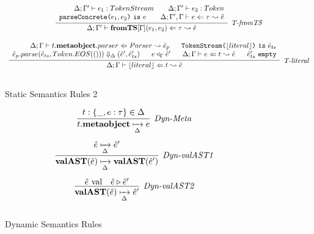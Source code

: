 \begin{figure}
\[\begin{array}{c}
\infer[\textit{T-fromTS}]
	  {\Delta; \Gamma' \vdash \keyw{fromTS}[\Gamma](e_1,e_2) \Leftarrow \tau \leadsto \hat{e} }
	  {\renewcommand{\arraystretch}{1}
	    \begin{array}{r}
	    \Delta;\Gamma' \vdash e_1:TokenStream ~~~~~~ \Delta;\Gamma' \vdash e_2:Token\\
            \texttt{parseConcrete(}e_1,e_2\texttt{)}\ \texttt{is}\ e ~~~~~~\Delta; \Gamma', \Gamma \vdash e \Leftarrow \tau \leadsto \hat{e}
            \end{array}
       } \\[3ex]  

\infer[\textit{T-literal}]
	  {\Delta; \Gamma \vdash \lfloor literal \rfloor \Leftarrow t \leadsto \hat{e} }
	  {\renewcommand{\arraystretch}{1}
	    \begin{array}{r}
	    \Delta;\Gamma \vdash t.\keyw{metaobject}.parser\Leftarrow Parser \leadsto \hat{e}_p ~~~~~ \texttt{TokenStream(}\lfloor literal \rfloor \texttt{)}\ \texttt{is}\ \hat{e}_{ts}\\
            \hat{e}_p.parse(\hat{e}_{ts}, Token.EOS(())) \Downarrow_{\Delta} (\hat{e}', \hat e_{ts}') ~~~~~  e \triangleleft_\Gamma \hat{e}'~~~~~ \Delta;\Gamma\vdash e\Leftarrow t \leadsto \hat{e} ~~~~~ \hat e_{ts}'\ \texttt{empty}
            \end{array}
       } \\[3ex]   
\end{array}
\]
\caption{Static Semantics Rules 2}
\end{figure}

\begin{figure}
\centering
\[
\begin{array}{c}

\infer[\textit{Dyn-Meta}]
	{t.\keyw{metaobject} \xmapsto[\Delta]{} e} 
	{t:\{\_,e:\tau \} \in \Delta}\\[3ex]

\infer[\textit{Dyn-valAST1}]
	{\keyw{valAST}(\hat{e}) \xmapsto[\Delta]{} \keyw{valAST}(\hat{e}') } 
	{\hat{e} \xmapsto[\Delta]{} \hat{e}'}\\[3ex]

\infer[\textit{Dyn-valAST2}]
	{\keyw{valAST}(\hat{e}) \xmapsto[\Delta]{} \hat{e}' } 
	{\hat{e}\ \text{val} &\hat{e} \triangleright \hat{e}' }\\[3ex]




\end{array}
\]
\caption{Dynamic Semantics Rules}
\end{figure}




